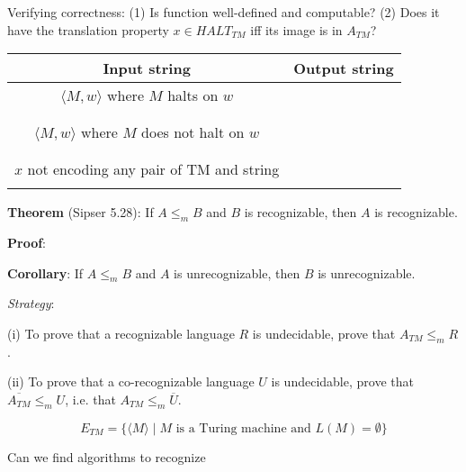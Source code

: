 \documentclass[12pt, oneside]{article}
\begin{document}
Verifying correctness: (1) Is function well-defined and computable? (2) Does it have the 
translation property $x \in HALT_{TM}$ iff its image is in $A_{TM}$? 
\begin{center}
\begin{tabular}{|c|c|}
\hline
Input string &  Output string \\
\hline
$\langle M, w \rangle$ where  $M$ halts on $w$ & \phantom{\hspace{4in}} \\
& \\& \\
$\langle M, w \rangle$ where $M$ does not halt on $w$ & \\
& \\&\\
$x$ not encoding any pair of  TM and string   &  \\
& \\
\hline
\end{tabular}
\end{center}

\vfill

\newpage


{\bf Theorem} (Sipser 5.28): If $A \leq_m B$ and $B$ is recognizable, then $A$ is recognizable.

{\bf Proof}: 

\vfill

{\bf Corollary}: If  $A \leq_m B$ and $A$ is unrecognizable, then $B$ is unrecognizable.

\vfill

{\it Strategy}:  

(i) To prove that a recognizable language $R$ is undecidable, prove that $A_{TM} \leq_m R$.


(ii) To prove that a co-recognizable language $U$ is undecidable, prove that $\overline{A_{TM}} \leq_m U$,
 i.e. that $A_{TM} \leq_m \overline{U}$.

 \newpage

\[
E_{TM} = \{ \langle M \rangle \mid \text{$M$ is a Turing machine and $L(M) = \emptyset$} \}
\]

\begin{comment}
Example  string in  $E_{TM}$ is \underline{\phantom{\hspace{1.6in}}} .
Example  string not  in  $E_{TM}$ is \underline{\phantom{\hspace{1.6in}}} .
\end{comment}

Can we find algorithms to recognize
\end{document}
